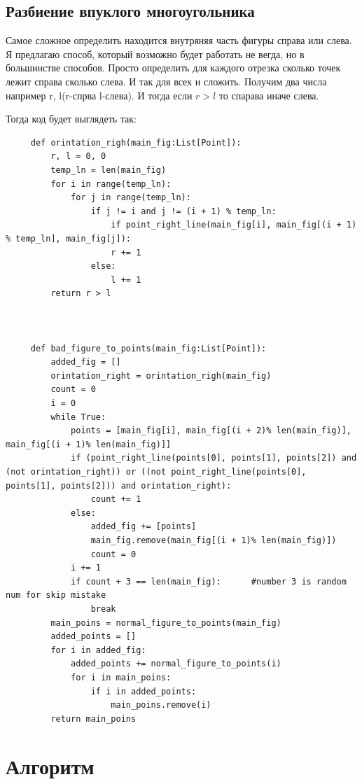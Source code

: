 \documentclass[12pt]{article} %
\begin{document}
 	 \subsection{Разбиение впуклого многоугольника}
 	 \hspace*{1cm}Самое сложное определить находится внутряняя часть фигуры справа или слева. Я предлагаю способ, который возможно будет работать не вегда, но в большинстве способов. Просто определить для каждого отрезка сколько точек лежит справа сколько слева. И так для всех и сложить. Получим два числа например r, l(r-спрва l-слева). И тогда если $r>l$ то спарава иначе слева. \par
 	 Тогда код будет выглядеть так:
 	 \begin{verbatim}
 	 def orintation_righ(main_fig:List[Point]):
 	     r, l = 0, 0
     	 temp_ln = len(main_fig)
 	     for i in range(temp_ln):
 	         for j in range(temp_ln):
 	             if j != i and j != (i + 1) % temp_ln:
 	                 if point_right_line(main_fig[i], main_fig[(i + 1) % temp_ln], main_fig[j]):
 	                 r += 1
 	             else:
 	                 l += 1
 	     return r > l
 	 
 	 
 	 
 	 def bad_figure_to_points(main_fig:List[Point]):
 	     added_fig = []
 	     orintation_right = orintation_righ(main_fig)
 	     count = 0
 	     i = 0
 	     while True:
 	         points = [main_fig[i], main_fig[(i + 2)% len(main_fig)], main_fig[(i + 1)% len(main_fig)]]
 	         if (point_right_line(points[0], points[1], points[2]) and (not orintation_right)) or ((not point_right_line(points[0], points[1], points[2])) and orintation_right):
 	             count += 1
 	         else:
 	             added_fig += [points]
 	             main_fig.remove(main_fig[(i + 1)% len(main_fig)])
 	             count = 0
 	         i += 1
 	         if count + 3 == len(main_fig):      #number 3 is random num for skip mistake
 	             break
 	     main_poins = normal_figure_to_points(main_fig)
 	     added_points = []
 	     for i in added_fig:
 	         added_points += normal_figure_to_points(i)
 	         for i in main_poins:
 	             if i in added_points:
 	                 main_poins.remove(i)
 	     return main_poins
 	\end{verbatim}
 	\section{Алгоритм}
 
\end{document}
